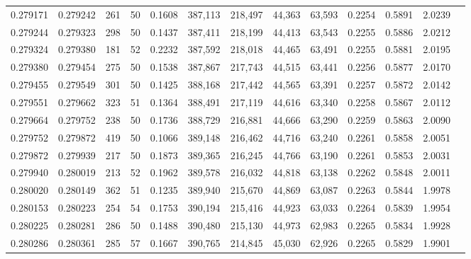 \begin{tabular}{rrrrrrrrrrrrr}
0.279171 & 0.279242 &   261 &  50 &                                     0.1608 & 387,113 & 218,497 &  44,363 &  63,593 & 0.2254 & 0.5891 & 2.0239 \\
0.279244 & 0.279323 &   298 &  50 &                                     0.1437 & 387,411 & 218,199 &  44,413 &  63,543 & 0.2255 & 0.5886 & 2.0212 \\
0.279324 & 0.279380 &   181 &  52 &                                     0.2232 & 387,592 & 218,018 &  44,465 &  63,491 & 0.2255 & 0.5881 & 2.0195 \\
0.279380 & 0.279454 &   275 &  50 &                                     0.1538 & 387,867 & 217,743 &  44,515 &  63,441 & 0.2256 & 0.5877 & 2.0170 \\
0.279455 & 0.279549 &   301 &  50 &                                     0.1425 & 388,168 & 217,442 &  44,565 &  63,391 & 0.2257 & 0.5872 & 2.0142 \\
0.279551 & 0.279662 &   323 &  51 &                                     0.1364 & 388,491 & 217,119 &  44,616 &  63,340 & 0.2258 & 0.5867 & 2.0112 \\
0.279664 & 0.279752 &   238 &  50 &                                     0.1736 & 388,729 & 216,881 &  44,666 &  63,290 & 0.2259 & 0.5863 & 2.0090 \\
0.279752 & 0.279872 &   419 &  50 &                                     0.1066 & 389,148 & 216,462 &  44,716 &  63,240 & 0.2261 & 0.5858 & 2.0051 \\
0.279872 & 0.279939 &   217 &  50 &                                     0.1873 & 389,365 & 216,245 &  44,766 &  63,190 & 0.2261 & 0.5853 & 2.0031 \\
0.279940 & 0.280019 &   213 &  52 &                                     0.1962 & 389,578 & 216,032 &  44,818 &  63,138 & 0.2262 & 0.5848 & 2.0011 \\
0.280020 & 0.280149 &   362 &  51 &                                     0.1235 & 389,940 & 215,670 &  44,869 &  63,087 & 0.2263 & 0.5844 & 1.9978 \\
0.280153 & 0.280223 &   254 &  54 &                                     0.1753 & 390,194 & 215,416 &  44,923 &  63,033 & 0.2264 & 0.5839 & 1.9954 \\
0.280225 & 0.280281 &   286 &  50 &                                     0.1488 & 390,480 & 215,130 &  44,973 &  62,983 & 0.2265 & 0.5834 & 1.9928 \\
0.280286 & 0.280361 &   285 &  57 &                                     0.1667 & 390,765 & 214,845 &  45,030 &  62,926 & 0.2265 & 0.5829 & 1.9901 \\

\end{tabular}
